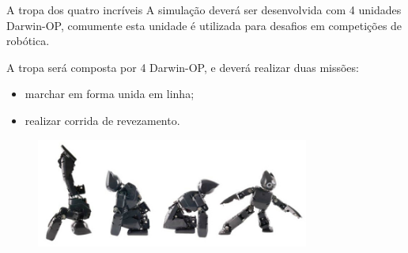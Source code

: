 \documentclass[aspectratio=169]{beamer}
\begin{document}
\begin{frame}[c]{A tropa dos quatro incríveis}
    A simulação deverá ser desenvolvida com 4 unidades Darwin-OP, comumente esta unidade é utilizada para desafios em competições de robótica.
    \newline

    A tropa será composta por 4 Darwin-OP, e deverá realizar duas missões:
    \begin{itemize}
        \item marchar em forma unida em linha;
        \item realizar corrida de revezamento.
    \end{itemize}


    \begin{figure}
        \includegraphics[width=0.8\textwidth]{darwin-op-sequencia}
    \end{figure}
\end{frame}
\end{document}
